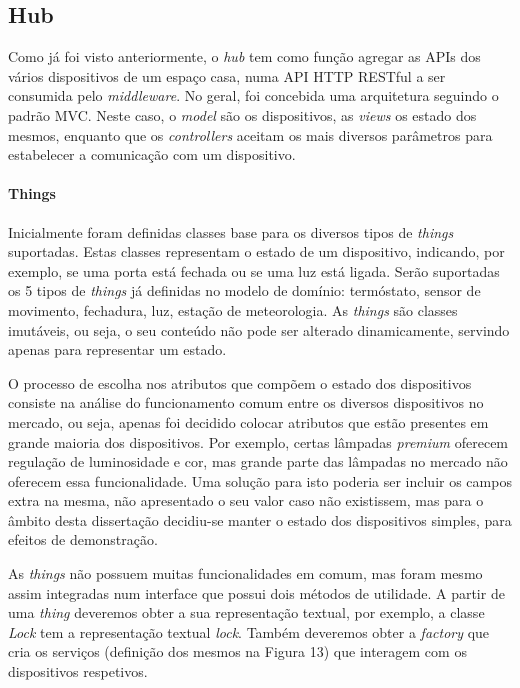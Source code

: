 
\subsection{Hub}

Como já foi visto anteriormente, o \textit{hub} tem como função agregar as APIs dos vários dispositivos de um espaço casa, numa API HTTP RESTful a ser consumida pelo \textit{middleware}. No geral, foi concebida uma arquitetura seguindo o padrão MVC. Neste caso, o \textit{model} são os dispositivos, as \textit{views} os estado dos mesmos, enquanto que os \textit{controllers} aceitam os mais diversos parâmetros para estabelecer a comunicação com um dispositivo.

%
%
%
%

\paragraph*{Things}

Inicialmente foram definidas classes base para os diversos tipos de \textit{things} suportadas. Estas classes representam o estado de um dispositivo, indicando, por exemplo, se uma porta está fechada ou se uma luz está ligada. Serão suportadas os 5 tipos de \textit{things} já definidas no modelo de domínio: termóstato, sensor de movimento, fechadura, luz, estação de meteorologia. As \textit{things} são classes imutáveis, ou seja, o seu conteúdo não pode ser alterado dinamicamente, servindo apenas para representar um estado.

O processo de escolha nos atributos que compõem o estado dos dispositivos consiste na análise do funcionamento comum entre os diversos dispositivos no mercado, ou seja, apenas foi decidido colocar atributos que estão presentes em grande maioria dos dispositivos. Por exemplo, certas lâmpadas \textit{premium} oferecem regulação de luminosidade e cor, mas grande parte das lâmpadas no mercado não oferecem essa funcionalidade. Uma solução para isto poderia ser incluir os campos extra na mesma, não apresentado o seu valor caso não existissem, mas para o âmbito desta dissertação decidiu-se manter o estado dos dispositivos simples, para efeitos de demonstração.

As \textit{things} não possuem muitas funcionalidades em comum, mas foram mesmo assim integradas num interface que possui dois métodos de utilidade. A partir de uma \textit{thing} deveremos obter a sua representação textual, por exemplo, a classe \textit{Lock} tem a representação textual \textit{lock}. Também deveremos obter a \textit{factory} que cria os serviços (definição dos mesmos na Figura 13) que interagem com os dispositivos respetivos.

